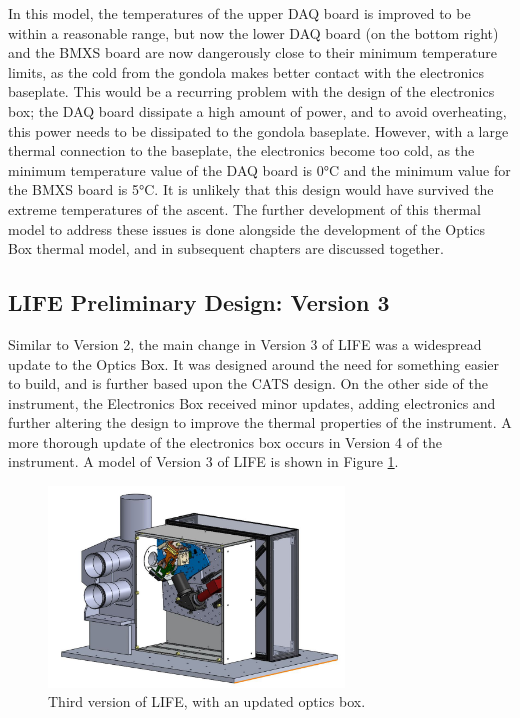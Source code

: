 In this model, the temperatures of the upper DAQ board is improved to be within a reasonable range, but now the lower DAQ board (on the bottom right) and the BMXS board are now dangerously close to their minimum temperature limits, as the cold from the gondola makes better contact with the electronics baseplate. This would be a recurring problem with the design of the electronics box; the DAQ board dissipate a high amount of power, and to avoid overheating, this power needs to be dissipated to the gondola baseplate. However, with a large thermal connection to the baseplate, the electronics become too cold, as the minimum temperature value of the DAQ board is 0°C and the minimum value for the BMXS board is 5°C. It is unlikely that this design would have survived the extreme temperatures of the ascent. The further development of this thermal model to address these issues is done alongside the development of the Optics Box thermal model, and in subsequent chapters are discussed together. 

\subsection{LIFE Preliminary Design: Version 3}

Similar to Version 2, the main change in Version 3 of LIFE was a widespread update to the Optics Box. It was designed around the need for something easier to build, and is further based upon the CATS design. On the other side of the instrument, the Electronics Box received minor updates, adding electronics and further altering the design to improve the thermal properties of the instrument. A more thorough update of the electronics box occurs in Version 4 of the instrument. A model of Version 3 of LIFE is shown in Figure \ref{fig:LIFE_V3}.

\begin{figure}
    \centering
    \includegraphics[width=0.7\textwidth]{chap3_images/LIFE_V3_images/LIFE_V3.JPG}
    \caption{Third version of LIFE, with an updated optics box.}
    \label{fig:LIFE_V3}
\end{figure}

